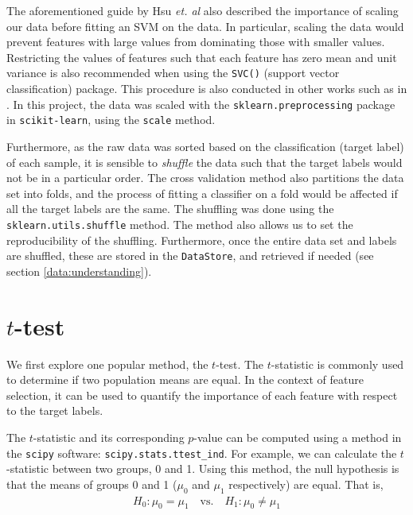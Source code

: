 \documentclass[12pt, twoside, a4paper]{report}
\begin{document}
The aforementioned guide by Hsu \textit{et. al} also described the importance of scaling our data before fitting an SVM on the data. In particular, scaling the data would prevent features with large values from dominating those with smaller values. Restricting the values of features such that each feature has zero mean and unit variance is also recommended when using the \texttt{SVC()} (support vector classification) package. This procedure is also conducted in other works such as in \cite{RefWorks:228}. In this project, the data was scaled with the \texttt{sklearn.preprocessing} package in \texttt{scikit-learn}, using the \texttt{scale} method.

Furthermore, as the raw data was sorted based on the classification (target label) of each sample, it is sensible to \textit{shuffle} the data such that the target labels would not be in a particular order. The cross validation method also partitions the data set into folds, and the process of fitting a classifier on a fold would be affected if all the target labels are the same. The shuffling was done using the \texttt{sklearn.utils.shuffle} method. The method also allows us to set the reproducibility of the shuffling. Furthermore, once the entire data set and labels are shuffled, these are stored in the \texttt{DataStore}, and retrieved if needed (see section \ref{data:understanding}).


\section{$t$-test} \label{t-test}

We first explore one popular method, the $t$-test. The $t$-statistic is commonly used to determine if two population means are equal. In the context of feature selection, it can be used to quantify the importance of each feature with respect to the target labels.

The $t$-statistic and its corresponding $p$-value can be computed using a method in the \texttt{scipy} \cite{scipy} software: \texttt{scipy.stats.ttest\_ind}. For example, we can calculate the $t$-statistic between two groups, 0 and 1. Using this method, the null hypothesis is that the means of groups 0 and 1 ($\mu_0$ and $\mu_1$ respectively) are equal. That is,
\begin{align*}
H_0: \mu_0 = \mu_1 \quad \text{vs.} \quad H_1: \mu_0 \neq \mu_1
\end{align*}
\end{document}
